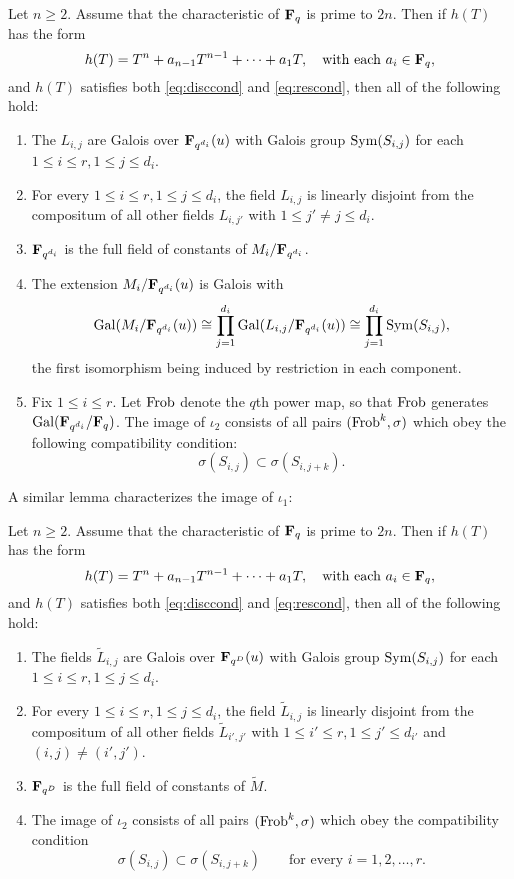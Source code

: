 \documentclass[a4paper]{compositio}
\begin{document}
\begin{lem}\label{lem:iota2} Let $n \geq 2$. Assume that the characteristic of $\mathbf{F}_q$ is prime to $2n$.
Then if $h(T)$ has the form
\[ h(T) = T^n + a_{n-1} T^{n-1} + \dots + a_1 T, \quad \text{with each $a_i \in \mathbf{F}_q$}, \]
and $h(T)$ satisfies both \eqref{eq:disccond} and
\eqref{eq:rescond}, then all of the following hold:
\begin{enumerate}
\item The $L_{i,j}$ are Galois over $\mathbf{F}_{q^{d_i}}(u)$ with
Galois group $\mathrm{Sym}(S_{i,j})$ for each $1 \leq i \leq r, 1 \leq j
\leq d_i$.
\item For every $1 \leq i \leq r, 1 \leq j \leq d_i$, the field $L_{i,j}$
is linearly disjoint from the compositum of all other fields $L_{i,
j'}$ with $1 \leq j' \neq j \leq d_i$.
\item $\mathbf{F}_{q^{d_i}}$ is the full field of constants of $M_i/\mathbf{F}_{q^{d_i}}$.
\item The extension $M_i/\mathbf{F}_{q^{d_i}}(u)$ is Galois with
\[ \mathrm{Gal}(M_i/\mathbf{F}_{q^{d_i}}(u)) \cong \prod_{j=1}^{d_i}
\mathrm{Gal}(L_{i,j}/\mathbf{F}_{q^{d_i}}(u)) \cong \prod_{j=1}^{d_i} \mathrm{Sym}(S_{i,j}),
\] the first isomorphism being induced by restriction in each
component.
\item Fix $1 \leq i \leq r$. Let $\mathrm{Frob}$ denote the $q$th power map, so that
$\mathrm{Frob}$ generates $\mathrm{Gal}(\mathbf{F}_{q^{d_i}}/\mathbf{F}_q)$. The image of $\iota_2$
consists of all pairs $(\mathrm{Frob}^k, \sigma)$ which obey the following
compatibility condition:
\[ \sigma(S_{i,j}) \subset \sigma(S_{i,j+k}). \]
\end{enumerate}
\end{lem}

A similar lemma characterizes the image of $\iota_1$:

\begin{lem}\label{lem:iota1} Let $n \geq 2$. Assume that the characteristic of $\mathbf{F}_q$ is prime to $2n$.
Then if $h(T)$ has the form
\[ h(T) = T^n + a_{n-1} T^{n-1} + \dots + a_1 T, \quad \text{with each $a_i \in \mathbf{F}_q$}, \]
and $h(T)$ satisfies both \eqref{eq:disccond} and
\eqref{eq:rescond}, then all of the following hold:
\begin{enumerate}
\item The fields $\widetilde{L}_{i,j}$ are Galois over $\mathbf{F}_{q^{D}}(u)$ with
Galois group $\mathrm{Sym}(S_{i,j})$ for each $1 \leq i \leq r, 1 \leq j
\leq d_i$.
\item For every $1 \leq i \leq r, 1 \leq j \leq d_i$, the field $\widetilde{L}_{i,j}$
is linearly disjoint from the compositum of all other fields
$\widetilde{L}_{i', j'}$ with $1 \leq i' \leq r,  1 \leq j' \leq
d_{i'}$ and $(i,j) \neq (i', j')$.
\item $\mathbf{F}_{q^{D}}$ is the full field of constants of $\widetilde{M}$.
\item The image of $\iota_2$ consists of all pairs $(\mathrm{Frob}^k, \sigma)$ which obey the
compatibility condition
\[ \sigma(S_{i,j}) \subset \sigma(S_{i,j+k}) \qquad \text{for every $i=1, 2, \dots, r$}. \]
\end{enumerate}
\end{lem}
\end{document}
